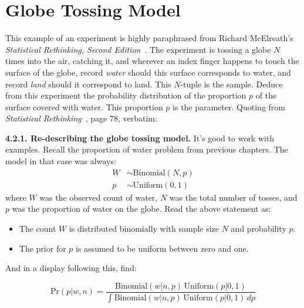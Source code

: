 \documentclass[
twoside=true,
paper=letter,
fontsize=9pt,
pagesize=auto,
leqno,
openany,
headsepline,
overfullrule,
]{scrbook}
\theoremstyle{plain}
\theoremstyle{plain}
\theoremstyle{definition}
\theoremstyle{bfnoteitalic}
\theoremstyle{bfnoteroman}
\begin{document}
\section{Globe Tossing Model}\label{globe_tossing}
This example of an experiment is highly paraphrased from Richard McElreath's  \textsl{Statistical Rethinking, Second Edition}~\cite{sr_mcelreath_2020}.
The experiment is tossing a globe $N$ times into the air, catching it, and wherever an index finger happens to touch the surface of the globe, record  \textit{water} should this surface corresponds to water, and record \textit{land} should it correspond to land. This $N$-tuple is the sample. Deduce from this experiment the probability distribution of the proportion $p$ of the surface covered with water. This proportion $p$ is the parameter.
Quoting from \textsl{Statistical Rethinking}~\cite{sr_mcelreath_2020}, page 78, verbatim:
\begin{quoting}\small
\textbf{4.2.1. Re-describing the globe tossing model.} It’s good to work with examples. Recall the
proportion of water problem from previous chapters. The model in that case was always:
\begin{align*}
W & \sim \text{Binomial}(N, p) \\
p & \sim \text{Uniform}(0, 1)
\end{align*}
where $W$ was the observed count of water, $N$ was the total number of tosses, and $p$ was the
proportion of water on the globe. Read the above statement as:
\begin{itemize}
\item[]The count $W$ is distributed binomially with sample size $N$ and probability $p$.
\item[]The prior for $p$ is assumed to be uniform between zero and one.
\end{itemize}
\end{quoting}
And in a display following this, find:
\begin{quoting}\small
\[
\text{Pr}(p\vert w,n)
=
\frac{\text{Binomial}(w\vert n,p)\,\text{Uniform}(p\vert 0,1)}
{\int \text{Binomial}(w\vert n,p)\,\text{Uniform}(p\vert 0,1)\, dp}
\]
\end{quoting}
\end{document}
